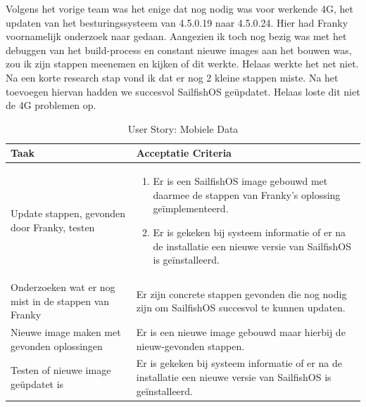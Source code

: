 \documentclass[a4paper]{report}
\newcommand{\userstorycolor}{PeachPuff1}
\begin{document}
  \begin{tcolorbox}[colback=white, coltitle=black, colframe=\userstorycolor, title=\textbf{User Story: }Als gebruiker wil ik graag met de Fairphone mobiele data kunnen gebruiken\, zodat ik ook onderweg internet kan gebruiken.]
    \par\smallskip 
    Volgens het vorige team was het enige dat nog nodig was voor werkende 4G, het updaten van het besturingssysteem van 4.5.0.19 naar 4.5.0.24.
    Hier had Franky voornamelijk onderzoek naar gedaan. Aangezien ik toch nog bezig was met het debuggen van het build-process en constant nieuwe images aan het bouwen was, zou ik zijn stappen meenemen en kijken of dit werkte.
    Helaas werkte het net niet. Na een korte research stap vond ik dat er nog 2 kleine stappen miste. Na het toevoegen hiervan hadden we succesvol SailfishOS geüpdatet.
    Helaas loste dit niet de 4G problemen op.

    \begin{table}[H]
        \centering
      \begin{tabularx}{1\textwidth}{|X|X|}
        \hline
        \cellcolor[HTML]{ffcc99} \textbf{Taak} & \cellcolor[HTML]{ffcc99} \textbf{Acceptatie Criteria} \\ 
        \hline
        Update stappen, gevonden door Franky, testen &
          \begin{enumerate}
          \item Er is een SailfishOS image gebouwd met daarmee de stappen van Franky's oplossing geïmplementeerd.  
          \item Er is gekeken bij systeem informatie of er na de installatie een nieuwe versie van SailfishOS is geïnstalleerd.
          \end{enumerate} \\
        \hline
        Onderzoeken wat er nog mist in de stappen van Franky & Er zijn concrete stappen gevonden die nog nodig zijn om SailfishOS succesvol te kunnen updaten. \\
        \hline 
        Nieuwe image maken met gevonden oplossingen & Er is een nieuwe image gebouwd maar hierbij de nieuw-gevonden stappen. \\ 
        \hline 
        Testen of nieuwe image geüpdatet is & Er is gekeken bij systeem informatie of er na de installatie een nieuwe versie van SailfishOS is geïnstalleerd. \\
        \hline 
        
      \end{tabularx}
      \caption{User Story: Mobiele Data}
    \label{table:it2:story_mobiledata}
    \end{table}
    \end{tcolorbox}
\end{document}
